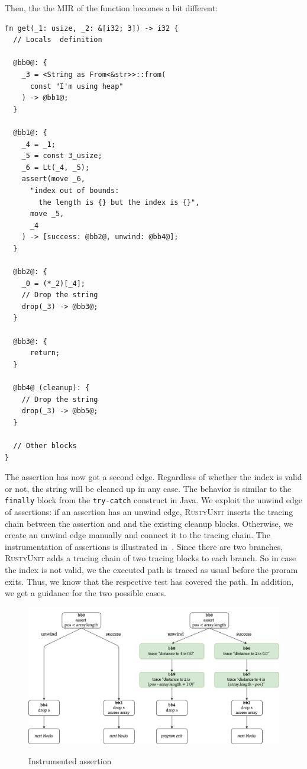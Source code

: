 \documentclass[paper=a4,%
  twoside,%
  BCOR4mm,%
  abstract=true,%
  toc=bibliography,%
  chapterprefix=true,%
  toc=bibliographynumbered,%
  open=right,%
  english,%
  pagesize=pdftex]{scrreprt}
\newcommand{\tech}{\textsc{RustyUnit}\xspace}
\newcommand{\mir}{\ac{MIR}\xspace}
\begin{document}
Then, the the \mir of the function becomes a bit different:
\begin{lstlisting}[language={MIR}, style=boxed, caption={}, label=lst:mir-boundary-check-with-unwinding]
fn get(_1: usize, _2: &[i32; 3]) -> i32 {
  // Locals  definition

  @bb0@: {
    _3 = <String as From<&str>>::from(
      const "I'm using heap"
    ) -> @bb1@;
  }

  @bb1@: {
    _4 = _1;
    _5 = const 3_usize;
    _6 = Lt(_4, _5);
    assert(move _6,
      "index out of bounds:
        the length is {} but the index is {}",
      move _5,
      _4
    ) -> [success: @bb2@, unwind: @bb4@];
  }

  @bb2@: {
    _0 = (*_2)[_4];
    // Drop the string
    drop(_3) -> @bb3@;
  }

  @bb3@: {
      return;
  }

  @bb4@ (cleanup): {
    // Drop the string
    drop(_3) -> @bb5@;
  }

  // Other blocks
}
\end{lstlisting}

The assertion has now got a second edge. Regardless of whether the index is valid or not, the string will be cleaned up in any case. The behavior is similar to the \texttt{finally} block from the \texttt{try-catch} construct in Java. We exploit the unwind edge of assertions: if an assertion has an unwind edge, \tech inserts the tracing chain between the assertion and and the existing cleanup blocks. Otherwise, we create an unwind edge manually and connect it to the tracing chain. The instrumentation of assertions is illustrated in~. Since there are two branches, \tech adds a tracing chain of two tracing blocks to each branch. So in case the index is not valid, we the executed path is traced as usual before the proram exits. Thus, we know that the respective test has covered the path. In addition, we get a guidance for the two possible cases.

\begin{figure}[h]
\caption{Instrumented assertion}
\centering
\includegraphics[width=\textwidth]{comparison-instrumented-assertion}
\label{fig:comparison-instrumented-assertion}
\end{figure}
\end{document}
